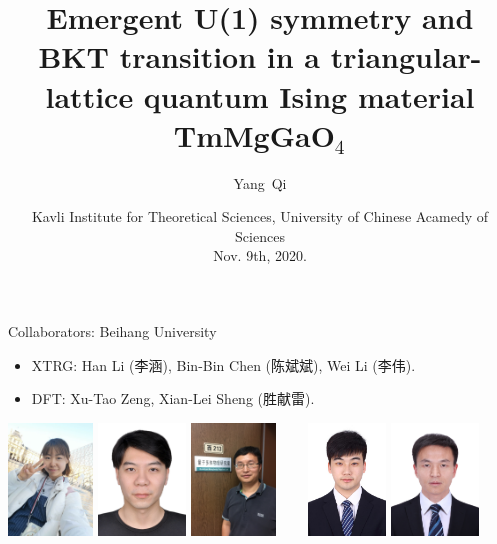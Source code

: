 \documentclass[xcolor=table, aspectratio=1610,ignorenonframetext]{beamer}
\title %
{Emergent U(1) symmetry and BKT transition in a triangular-lattice quantum Ising material TmMgGaO${}_4$}
\author[Y Qi] %
{Yang~Qi}
\institute[Fudan] %
{
Department of Physics, Fudan University.
}
\date{Kavli Institute for Theoretical Sciences, University of Chinese Acamedy of Sciences\\ Nov. 9th, 2020.}
\begin{document}
\begin{frame}
  \titlepage
\end{frame}

\begin{frame}{Collaborators: Beihang University}
\begin{itemize}
	\item XTRG: Han Li (李涵), Bin-Bin Chen (陈斌斌), Wei Li (李伟).
	\item DFT: Xu-Tao Zeng, Xian-Lei Sheng (胜献雷).
\end{itemize}
	\begin{center}
		\includegraphics[height=3cm]{../people/hanli}
		\includegraphics[height=3cm]{../people/binbinchen}
		\includegraphics[height=3cm]{../people/weili}~~~~
		\includegraphics[height=3cm]{../people/xutaozeng}
		\includegraphics[height=3cm]{../people/xianleisheng}
	\end{center}
\end{frame}
\end{document}
